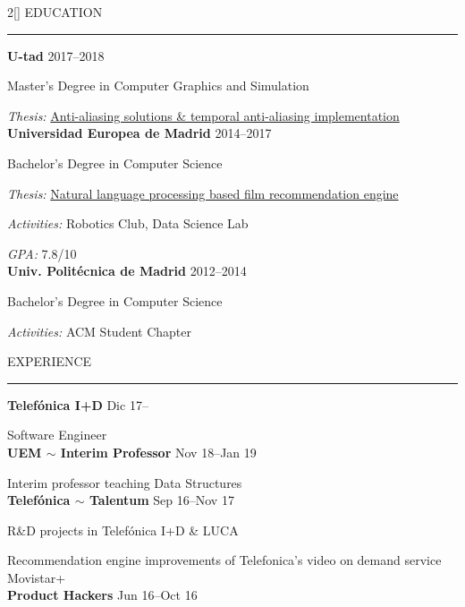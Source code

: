 \documentclass[a4paper, 12pt]{article}
\newenvironment{myparacol}[2][]{%
\begin{paracol}{#2}[#1]\setlength{\parindent}{0pt}}{%
\end{paracol}}
\begin{document}
\setlength{\columnsep}{24pt}
\begin{sloppypar}
\begin{myparacol}{2}
    EDUCATION
    \vspace{1mm}
    \hrule
    \kern9pt
    \textbf{U-tad} \hfill 2017--2018

    Master's Degree in Computer Graphics and Simulation

    \textit{Thesis:} \href{https://github.com/hugo19941994/temporal-aa-doc/raw/master/thesis.pdf}{Anti-aliasing solutions \& temporal anti-aliasing implementation}\\

    \textbf{Universidad Europea de Madrid} \hfill 2014--2017

    Bachelor's Degree in Computer Science

    \textit{Thesis:} \href{https://github.com/hugo19941994/movie-pepper-doc/raw/master/thesis.pdf}{Natural language processing based film recommendation engine}

    \textit{Activities:} Robotics Club, Data Science Lab

    \textit{GPA:} 7.8/10\\

    \textbf{Univ. Politécnica de Madrid} \hfill 2012--2014

    Bachelor's Degree in Computer Science

    \textit{Activities:} ACM Student Chapter
    \\

    \switchcolumn{}

    EXPERIENCE
    \vspace{1mm}
    \hrule
    \kern9pt

    \textbf{Telefónica I+D} \hfill Dic 17--

    Software Engineer\\

    \textbf{UEM $\sim$ Interim Professor} \hfill Nov 18--Jan 19

    Interim professor teaching Data Structures\\

    \textbf{Telefónica $\sim$ Talentum} \hfill Sep 16--Nov 17

    R\&D projects in Telefónica I+D \& LUCA

    Recommendation engine improvements of Telefonica's video on demand service Movistar+\\

    \textbf{Product Hackers} \hfill Jun 16--Oct 16


\end{myparacol}
\end{sloppypar}
\end{document}
